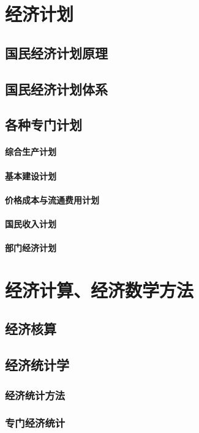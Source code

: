 \documentclass[UTF8]{../../RepresentationUniverse}
\begin{document}
\chapter{经济计划}
\section{国民经济计划原理}
\section{国民经济计划体系}
\section{各种专门计划}
    \subsubsection{综合生产计划}
    \subsubsection{基本建设计划}
    \subsubsection{价格成本与流通费用计划}
    \subsubsection{国民收入计划}
    \subsubsection{部门经济计划}



\chapter{经济计算、经济数学方法}
\section{经济核算}
\section{经济统计学}
    \subsection{经济统计方法}
    \subsection{专门经济统计}
\end{document}
